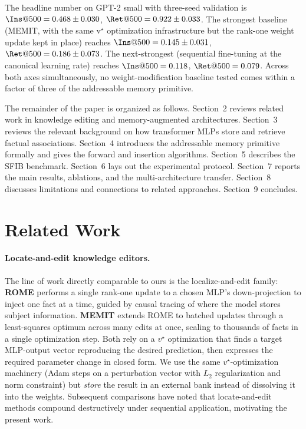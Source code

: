 \documentclass[11pt,a4paper]{article}
\begin{document}
The headline number on GPT-2 small with three-seed validation is
$\Ins@500 = 0.468 \pm 0.030$, $\Ret@500 = 0.922 \pm 0.033$. The strongest
baseline (MEMIT, with the same v$^\star$ optimization infrastructure but
the rank-one weight update kept in place) reaches $\Ins@500 = 0.145 \pm
0.031$, $\Ret@500 = 0.186 \pm 0.073$. The next-strongest
(sequential fine-tuning at the canonical learning rate) reaches $\Ins@500
= 0.118$, $\Ret@500 = 0.079$. Across both axes simultaneously, no
weight-modification baseline tested comes within a factor of three of
the addressable memory primitive.

The remainder of the paper is organized as follows. Section~2
reviews related work in knowledge editing and memory-augmented
architectures. Section~3 reviews the relevant background on how
transformer MLPs store and retrieve factual associations. Section~4
introduces the addressable memory primitive formally and gives the
forward and insertion algorithms. Section~5 describes the SFIB benchmark.
Section~6 lays out the experimental protocol. Section~7 reports the
main results, ablations, and the multi-architecture transfer.
Section~8 discusses limitations and connections to related approaches.
Section~9 concludes.

\section{Related Work}

\paragraph{Locate-and-edit knowledge editors.}
The line of work directly comparable to ours is the localize-and-edit
family: \textbf{ROME} \citep{meng2022rome} performs a single rank-one
update to a chosen MLP's down-projection to inject one fact at a time,
guided by causal tracing of where the model stores subject information.
\textbf{MEMIT} \citep{meng2022memit} extends ROME to batched updates
through a least-squares optimum across many edits at once, scaling to
thousands of facts in a single optimization step. Both rely on a $v^\star$
optimization that finds a target MLP-output vector reproducing the desired
prediction, then expresses the required parameter change in closed form.
We use the same $v^\star$-optimization machinery (Adam steps on a
perturbation vector with $L_2$ regularization and norm constraint) but
\emph{store} the result in an external bank instead of dissolving it into
the weights. Subsequent comparisons \citep{hartvigsen2023grace,
hase2023doesedits} have noted that locate-and-edit methods compound
destructively under sequential application, motivating the present work.
\end{document}
